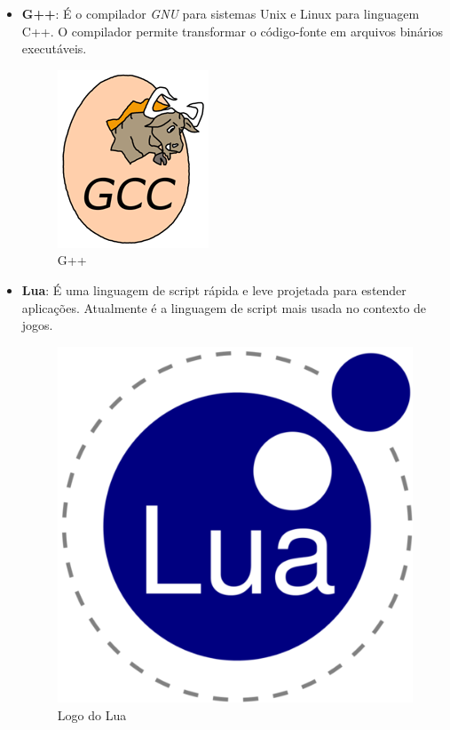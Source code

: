 \documentclass[11pt]{article} %
\begin{document}
\begin{itemize}
\item \textbf{G++}: É o compilador \textit{GNU} para sistemas Unix e Linux para linguagem C++. O compilador permite transformar o código-fonte em arquivos binários executáveis.

\begin{figure}[!htp]
\centering
\includegraphics[scale=0.4]{res/GCC.png}
\caption{G++}
\label{Logo do G++}
\end{figure}

\item \textbf{Lua}: É uma linguagem de script rápida e leve projetada para estender aplicações. Atualmente é a linguagem de script mais usada no contexto de jogos.

\begin{figure}[!htp]
\centering
\includegraphics[scale=0.2]{res/lua.png}
\caption{Logo do Lua}
\label{Logo do Lua}
\end{figure}


\end{itemize}
\end{document}
